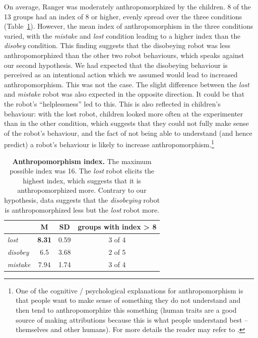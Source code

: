 \documentclass{sig-alternate}
\begin{document}
On average, Ranger was moderately anthropomorphized by the children. 8 of the 13
groups had an index of 8 or higher, evenly spread over the three conditions
(Table~\ref{tab:domino-anth-score}). However, the mean index of anthropomorphism
in the three conditions varied, with the \textit{mistake} and \textit{lost}
condition leading to a higher index than the \textit{disobey} condition. This
finding suggests that the disobeying robot was less anthropomorphized than the
other two robot behaviours, which speaks against our second hypothesis. We had
expected that the disobeying behaviour is perceived as an intentional action
which we assumed would lead to increased anthropomorphism. This was not the
case. The slight difference between the \textit{lost} and \textit{mistake} robot
was also expected in the opposite direction. It could be that the robot's
``helplessness'' led to this. This is also reflected in children's behaviour:
with the lost robot, children looked more often at the experimenter than in the
other condition, which suggests that they could not fully make sense of the
robot's behaviour, and the fact of not being able to understand (and hence
predict) a robot's behaviour is likely to increase
anthropomorphism.\footnote{One of the cognitive / psychological explanations for
anthropomorphism is that people want to make sense of something they do not
understand and then tend to anthropomorphize this something (human traits
are a good source of making attributions because this is what people
understand best -- themselves and other humans). For more details the reader may
refer to \cite{epley_seeing_2007}.}

\begin{table}[ht!]
    \centering
    \footnotesize
    \begin{tabular}{lccc}
        \toprule
        & M & SD & groups with index > 8 \\
        \midrule

        \textit{lost} & \textbf{8.31} & 0.59 & 3 of 4 \\ 
        \textit{disobey} & 6.5 & 3.68 & 2 of 5 \\
        \textit{mistake} & 7.94 & 1.74 & 3 of 4 \\ 
        \bottomrule
    \end{tabular}
    \caption{\textbf{Anthropomorphism index.} The maximum possible index was 16. The
    \textit{lost} robot elicits the highest index, which suggests that it is
    anthropomorphized more. Contrary to our hypothesis, data suggests that the
    \textit{disobeying} robot is anthropomorphized less but the \textit{lost} robot
    more.}

    \label{tab:domino-anth-score}       %
\end{table}	
\end{document}

